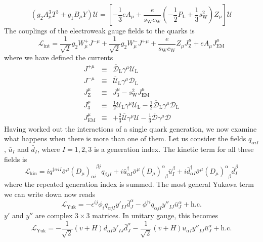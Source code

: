 \[(g_2A^3_{\mu}T^3 + g_1 B_{\mu} Y) \mathcal{U} = \left[ - \frac{1}{3}eA_{\mu} + \frac{e}{s_{\mathrm{W}} c_{\mathrm{W}}}( -\frac{1}{2}P_{\mathrm{L}} +\frac{1}{3}  s_{\mathrm{W}}^2)Z_{\mu} \right] \mathcal{U}\]
The couplings of the electroweak gauge fields to the quarks is
\[\mathcal{L}_{\mathrm{int}} = \frac{1}{\sqrt{2}}g_2W_{\mu}^{+} J^{-\mu} + \frac{1}{\sqrt{2}}g_2W_{\mu}^{-} J^{+\mu} +  \frac{e}{s_{\mathrm{W}} c_{\mathrm{W}}} Z_{\mu}J_{\mathrm{Z}}^{\mu} + eA_{\mu}J^{\mu}_{\mathrm{EM}}\] 
where we have defined the currents
\begin{eqnarray}
J^{+\mu} &\equiv & \overline{\mathcal{D}}_{\mathrm{L}} \gamma^{\mu} \mathcal{U}_{\mathrm{L}} \nonumber \\
J^{-\mu} &\equiv & \overline{\mathcal{U}}_{\mathrm{L}} \gamma^{\mu} \mathcal{D}_{\mathrm{L}} \nonumber \\
J_{\mathrm{Z}}^{\mu} &\equiv & J_3^{\mu} - s_{\mathrm{W}}^2 J^{\mu}_{\mathrm{EM}} \nonumber \\
J_3^{\mu} &\equiv & \frac{1}{2}\overline{\mathcal{U}}_{\mathrm{L}} \gamma^{\mu} \mathcal{U}_{\mathrm{L}} - \frac{1}{2}\overline{\mathcal{D}}_{\mathrm{L}} \gamma^{\mu} \mathcal{D}_{\mathrm{L}} \nonumber \\
J^{\mu}_{\mathrm{EM}} &\equiv &  +\frac{2}{3}\overline{\mathcal{U}} \gamma^{\mu} \mathcal{U} - \frac{1}{3}\overline{\mathcal{D}} \gamma^{\mu} \mathcal{D} \nonumber
\end{eqnarray}
Having worked out the interactions of a single quark generation, we now examine what happens when there is more than one of them.
Let us consider the fields $q_{\alpha iI}$, $\bar{u}_{I}$ and $\bar{d}_{I}$, where $I=1,2,3$ is a generation index. The kinetic term for all these fields is
\[\mathcal{L}_{\mathrm{kin}} = iq^{\dagger\alpha i I} \overline{\sigma}^{\mu}(D_{\mu})_{\alpha i}^{\phantom{\alpha i}\beta j} q_{\beta jI} + i\bar{u}_{\alpha I}^{\dagger}\overline{\sigma}^{\mu} (D_{\mu})^{\alpha}_{\phantom{\alpha}\beta}\bar{u}_I^{\beta} + i\bar{d}_{\alpha I}^{\dagger}\overline{\sigma}^{\mu} (D_{\mu})^{\alpha}_{\phantom{\alpha}\beta}\bar{d}_I^{\beta}\]
where the repeated generation index is summed. The most general Yukawa term we can write down now reads
\[\mathcal{L}_{\mathrm{Yuk}} = -\epsilon^{ij}\phi_i q_{\alpha jI}y'_{IJ} \bar{d}^{\alpha}_{J} -\phi^{\dagger i} q_{\alpha jI}y''_{IJ} \bar{u}^{\alpha}_{J} + \mathrm{h.c.}\]
$y'$ and $y''$ are complex $3 \times 3$ matrices. In unitary gauge, this becomes
\[\mathcal{L}_{\mathrm{Yuk}} = -\frac{1}{\sqrt{2}}(v+H) d_{\alpha I}y'_{IJ} \bar{d}^{\alpha}_{J} -\frac{1}{\sqrt{2}}(v+H) u_{\alpha I}y''_{IJ} \bar{u}^{\alpha}_{J} + \mathrm{h.c.}\]
